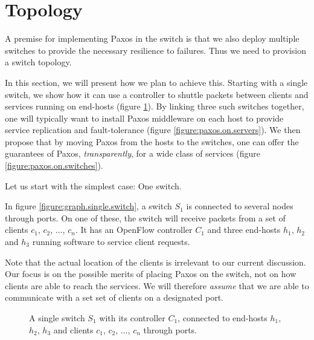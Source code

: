 \section{Topology}

A premise for implementing Paxos in the switch is that we also deploy
multiple switches to provide the necessary resilience to failures.
%
Thus we need to provision a switch topology.

In this section, we will present how we plan to achieve this.
%
Starting with a single switch, we show how it can use a controller to
shuttle packets between clients and services running on end-hosts (figure
\ref{figure:graph.single.switch}).
%
By linking three such switches together, one will typically want to install
Paxos middleware on each host to provide service replication and
fault-tolerance (figure \ref{figure:paxos.on.servers}).
%
We then propose that by moving Paxos from the hosts to the switches, one can
offer the guarantees of Paxos, \textit{transparently}, for a wide class of
services (figure \ref{figure:paxos.on.switches}).

Let us start with the simplest case: One switch.

In figure \vref{figure:graph.single.switch}, a switch $S_1$ is connected to
several nodes through ports.  On one of these, the switch will receive
packets from a set of clients $c_1$, $c_2$, $\dots$, $c_n$.
%
It has an OpenFlow controller $C_1$ and three end-hosts $h_1$, $h_2$ and
$h_3$ running software to service client requests.

Note that the actual location of the clients is irrelevant to our current
discussion.  Our focus is on the possible merits of placing Paxos on the
switch, not on how clients are able to reach the services. We will therefore
\textit{assume} that we are able to communicate with a set set of clients on
a designated port.

\begin{figure}[H]
  \centering
  \caption{A single switch $S_1$ with its controller $C_1$, connected
    to end-hosts $h_1$, $h_2$, $h_3$ and clients $c_1$, $c_2$, $\dots$, $c_n$
    through ports.}
  \label{figure:graph.single.switch}
\end{figure}

